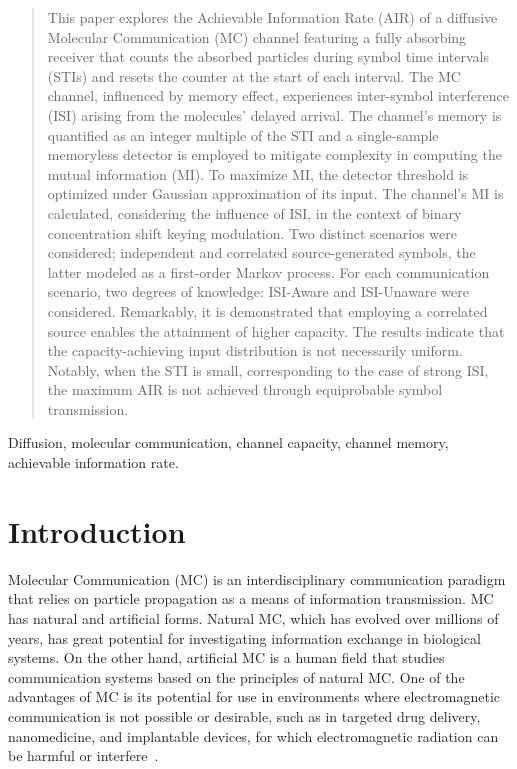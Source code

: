 \documentclass[journal]{IEEEtranTCOM}
\begin{document}
\begin{abstract}
This paper explores the Achievable Information Rate (AIR) of a diffusive Molecular Communication (MC) channel featuring a fully absorbing receiver that counts the absorbed particles during symbol time intervals (STIs) and resets the counter at the start of each interval. The MC channel, influenced by memory effect, experiences inter-symbol interference (ISI) arising from the molecules' delayed arrival. The channel's memory is quantified as an integer multiple of the STI and a single-sample memoryless detector is employed to mitigate complexity in computing the mutual information (MI). To maximize MI, the detector threshold is optimized under Gaussian approximation of its input. The channel's MI is calculated, considering the influence of ISI, in the context of binary concentration shift keying modulation. Two distinct scenarios were considered; independent and correlated source-generated symbols, the latter modeled as a first-order Markov process. For each communication scenario, two degrees of knowledge: ISI-Aware and ISI-Unaware were considered. Remarkably, it is demonstrated that employing a correlated source enables the attainment of higher capacity. The results indicate that the capacity-achieving input distribution is not necessarily uniform. Notably, when the STI is small, corresponding to the case of strong ISI, the maximum AIR is not achieved through equiprobable symbol transmission.
\end{abstract}
\begin{IEEEkeywords}
Diffusion, molecular communication, channel capacity, channel memory, achievable information rate.
\end{IEEEkeywords}
\IEEEpeerreviewmaketitle
\section{Introduction}
Molecular Communication (MC) is an interdisciplinary communication paradigm that relies on particle propagation as a means of information transmission. MC has natural and artificial forms. Natural MC, which has evolved over millions of years, has great potential for investigating information exchange in biological systems. On the other hand, artificial MC is a human field that studies communication systems based on the principles of natural MC. One of the advantages of MC is its potential for use in environments where electromagnetic communication is not possible or desirable, such as in targeted drug delivery, nanomedicine, and implantable devices, for which electromagnetic radiation can be harmful or interfere~\cite{zhao2021release,rudsari2021targeted}. 
\end{document}
